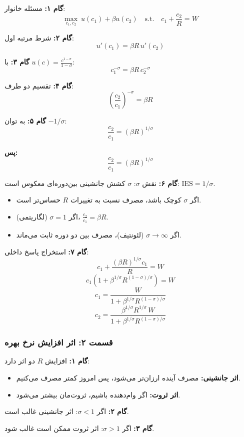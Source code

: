 \documentclass[12pt,a4paper]{article}
\begin{document}
\textbf{گام ۱:} مسئله خانوار:
\[
	\max_{c_1, c_2} \ u(c_1) + \beta u(c_2)
	\quad \text{s.t.} \quad
	c_1 + \frac{c_2}{R} = W
\]

\textbf{گام ۲:} شرط مرتبه اول:
\[
	u'(c_1) = \beta R \, u'(c_2)
\]

\textbf{گام ۳:} با $u(c) = \frac{c^{1-\sigma}}{1-\sigma}$:
\[
	c_1^{-\sigma} = \beta R \, c_2^{-\sigma}
\]

\textbf{گام ۴:} تقسیم دو طرف:
\[
	\left( \frac{c_2}{c_1} \right)^{-\sigma} = \beta R
\]

\textbf{گام ۵:} به توان $-1/\sigma$:
\[
	\frac{c_2}{c_1} = (\beta R)^{1/\sigma}
\]

\textbf{پس:}
\[
	\boxed{\frac{c_2}{c_1} = (\beta R)^{1/\sigma}}
\]

\textbf{گام ۶:} نقش $\sigma$: $\sigma$ کشش جانشینی بین‌دوره‌ای معکوس است: $\text{IES} = 1/\sigma$.
\begin{itemize}
	\item اگر $\sigma$ کوچک باشد، مصرف نسبت به تغییرات $R$ حساس‌تر است.
	\item اگر $\sigma = 1$ (لگاریتمی)، $\frac{c_2}{c_1} = \beta R$.
	\item اگر $\sigma \to \infty$ (لئونتیف)، مصرف بین دو دوره ثابت می‌ماند.
\end{itemize}

\textbf{گام ۷:} استخراج پاسخ داخلی:
\[
	c_1 + \frac{(\beta R)^{1/\sigma} c_1}{R} = W
\]
\[
	c_1 \left( 1 + \beta^{1/\sigma} R^{(1-\sigma)/\sigma} \right) = W
\]
\[
	\boxed{c_1 = \frac{W}{1 + \beta^{1/\sigma} R^{(1-\sigma)/\sigma}}}
\]
\[
	\boxed{c_2 = \frac{\beta^{1/\sigma} R^{1/\sigma} \, W}{1 + \beta^{1/\sigma} R^{(1-\sigma)/\sigma}}}
\]

\subsubsection{قسمت ۲: اثر افزایش نرخ بهره}

\textbf{گام ۱:} افزایش $R$ دو اثر دارد:
\begin{itemize}
	\item \textbf{اثر جانشینی:} مصرف آینده ارزان‌تر می‌شود، پس امروز کمتر مصرف می‌کنیم.
	\item \textbf{اثر ثروت:} اگر وام‌دهنده باشیم، ثروت‌مان بیشتر می‌شود.
\end{itemize}

\textbf{گام ۲:} اگر $\sigma < 1$: اثر جانشینی غالب است.

\textbf{گام ۳:} اگر $\sigma > 1$: اثر ثروت ممکن است غالب شود.
\end{document}
